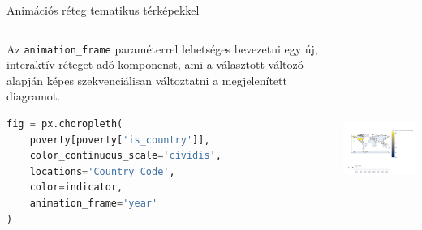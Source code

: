 \documentclass[english, aspectratio=169]{beamer}
\begin{document}
\begin{frame}[fragile]{Animációs réteg tematikus térképekkel}
	\begin{columns}
		\begin{column}{.5\textwidth}
			Az \texttt{animation\_frame} paraméterrel lehetséges bevezetni egy új, interaktív réteget adó komponenst, ami a választott változó alapján képes szekvenciálisan változtatni a megjelenített diagramot.\par\medskip
			\begin{lstlisting}[language=python]
fig = px.choropleth(
	poverty[poverty['is_country']],
	color_continuous_scale='cividis',
	locations='Country Code',
	color=indicator,
	animation_frame='year'
)				
			\end{lstlisting}
		\end{column}
		\begin{column}{.5\textwidth}
			\begin{center}
				\includegraphics[width=7cm, height=7cm, keepaspectratio]{images/scatter_21.png}
			\end{center}
		\end{column}
	\end{columns}
\end{frame}
\end{document}
